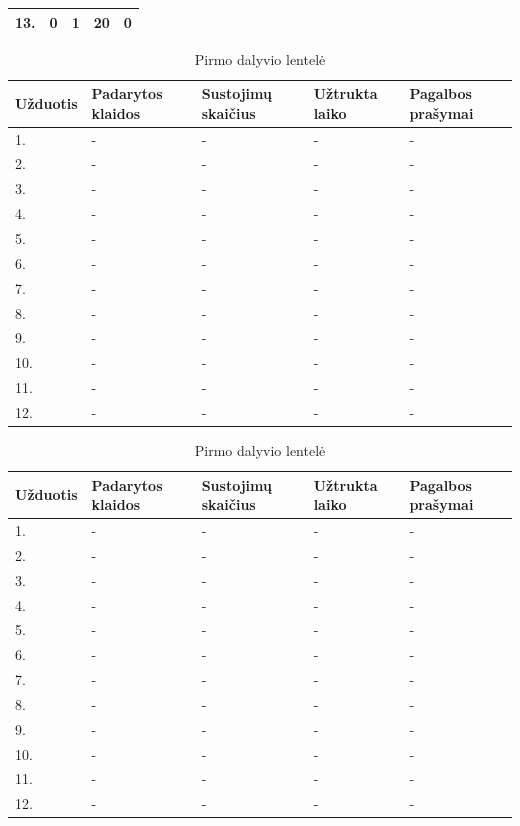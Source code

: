 \documentclass[oneside]{VUMIFPSkursinis}
\begin{document}
\begin{center}
\begin{table}[!pht]
\begin{tabular}{ |p{1.8cm} | p{3.4cm} | p{3.4cm} | p{2.5cm} | p{3.5cm}|}
13.&0&1&20&0 \\ \hline
\end{tabular}
\end{table}
\vspace{0.7cm}
	\begin{table}[!pht]
	\caption{Pirmo dalyvio lentelė}
	\begin{tabular}{ |p{1.8cm} | p{3.4cm} | p{3.4cm} | p{2.5cm} | p{3.5cm}|}
	\hline
	Užduotis&Padarytos klaidos&Sustojimų skaičius&Užtrukta laiko&Pagalbos prašymai\\ \hline
1.&-&-&-&- \\ \hline
2.&-&-&-&- \\ \hline
3.&-&-&-&- \\ \hline
4.&-&-&-&- \\ \hline
5.&-&-&-&- \\ \hline
6.&-&-&-&- \\ \hline
7.&-&-&-&- \\ \hline
8.&-&-&-&- \\ \hline
9.&-&-&-&- \\ \hline
10.&-&-&-&- \\ \hline
11.&-&-&-&- \\ \hline
12.&-&-&-&- \\ \hline
\end{tabular}
\end{table}
\vspace{0.7cm}
	\begin{table}[!pht]
	\caption{Pirmo dalyvio lentelė}
	\begin{tabular}{ |p{1.8cm} | p{3.4cm} | p{3.4cm} | p{2.5cm} | p{3.5cm}|}
	\hline
	Užduotis&Padarytos klaidos&Sustojimų skaičius&Užtrukta laiko&Pagalbos prašymai\\ \hline
1.&-&-&-&- \\ \hline
2.&-&-&-&- \\ \hline
3.&-&-&-&- \\ \hline
4.&-&-&-&- \\ \hline
5.&-&-&-&- \\ \hline
6.&-&-&-&- \\ \hline
7.&-&-&-&- \\ \hline
8.&-&-&-&- \\ \hline
9.&-&-&-&- \\ \hline
10.&-&-&-&- \\ \hline
11.&-&-&-&- \\ \hline
12.&-&-&-&- \\ \hline
\end{tabular}
\end{table}

\end{center}
\end{document}
